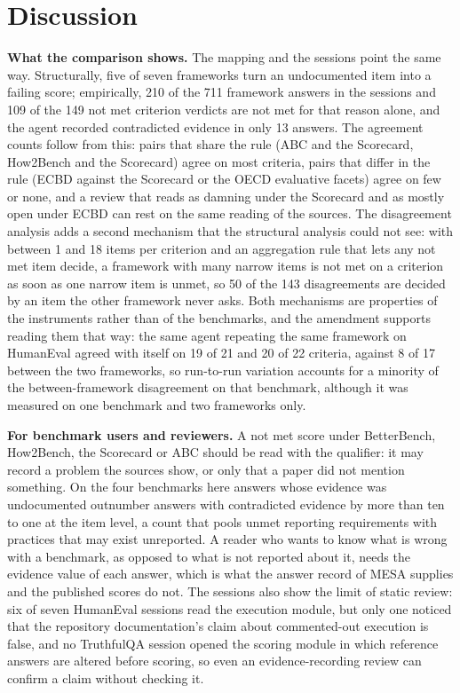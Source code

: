 \documentclass[10pt,conference]{IEEEtran}
\begin{document}
\section{Discussion}
\textbf{What the comparison shows.} The mapping and the sessions point the same way. Structurally, five of seven frameworks turn an undocumented item into a failing score; empirically, 210 of the 711 framework answers in the sessions and 109 of the 149 not met criterion verdicts are not met for that reason alone, and the agent recorded contradicted evidence in only 13 answers. The agreement counts follow from this: pairs that share the rule (ABC and the Scorecard, How2Bench and the Scorecard) agree on most criteria, pairs that differ in the rule (ECBD against the Scorecard or the OECD evaluative facets) agree on few or none, and a review that reads as damning under the Scorecard and as mostly open under ECBD can rest on the same reading of the sources. The disagreement analysis adds a second mechanism that the structural analysis could not see: with between 1 and 18 items per criterion and an aggregation rule that lets any not met item decide, a framework with many narrow items is not met on a criterion as soon as one narrow item is unmet, so 50 of the 143 disagreements are decided by an item the other framework never asks. Both mechanisms are properties of the instruments rather than of the benchmarks, and the amendment supports reading them that way: the same agent repeating the same framework on HumanEval agreed with itself on 19 of 21 and 20 of 22 criteria, against 8 of 17 between the two frameworks, so run-to-run variation accounts for a minority of the between-framework disagreement on that benchmark, although it was measured on one benchmark and two frameworks only.

\textbf{For benchmark users and reviewers.} A not met score under BetterBench, How2Bench, the Scorecard or ABC should be read with the qualifier: it may record a problem the sources show, or only that a paper did not mention something. On the four benchmarks here answers whose evidence was undocumented outnumber answers with contradicted evidence by more than ten to one at the item level, a count that pools unmet reporting requirements with practices that may exist unreported. A reader who wants to know what is wrong with a benchmark, as opposed to what is not reported about it, needs the evidence value of each answer, which is what the answer record of MESA supplies and the published scores do not. The sessions also show the limit of static review: six of seven HumanEval sessions read the execution module, but only one noticed that the repository documentation's claim about commented-out execution is false, and no TruthfulQA session opened the scoring module in which reference answers are altered before scoring, so even an evidence-recording review can confirm a claim without checking it.
\end{document}

